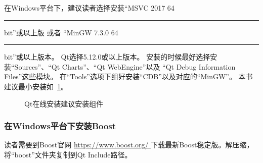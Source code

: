 在Windows平台下，建议读者选择安装“MSVC 2017 64\hspace{0.05em}\rule[0.7ex]{0.4em}{0.65pt}\hspace{0.05em}bit”或以上版
或者
“MinGW 7.3.0 64\hspace{0.05em}\rule[0.7ex]{0.4em}{0.65pt}\hspace{0.05em}bit”或以上版本。
Qt选择5.12.0或以上版本。
安装的时候最好选择安装“Sources”、“Qt Charts”、“Qt WebEngine”以及
“Qt Debug Information Files”这些模块。
在“Tools”选项下组好安装“CDB”以及对应的“MinGW”。
本书建议最小安装如\figurename\ \ref{p000001}。
\begin{figure}[htb] %
\marginnote{\setlength\fboxsep{2pt}\fbox{\footnotesize{\kaishu\figurename\,}\footnotesize{\ref{p000001}}}}\centering %
\setlength\fboxsep{0pt} %
\caption{Qt在线安装建议安装组件} %
\label{p000001} %
\end{figure}


\FloatBarrier
\subsubsection{
在Windows平台下安装Boost
}\label{ss000210}

读者需要到Boost官网 \url{https://www.boost.org/
}下载最新Boost稳定版。解压缩，将“boost”文件夹复制到Qt Include路径。

